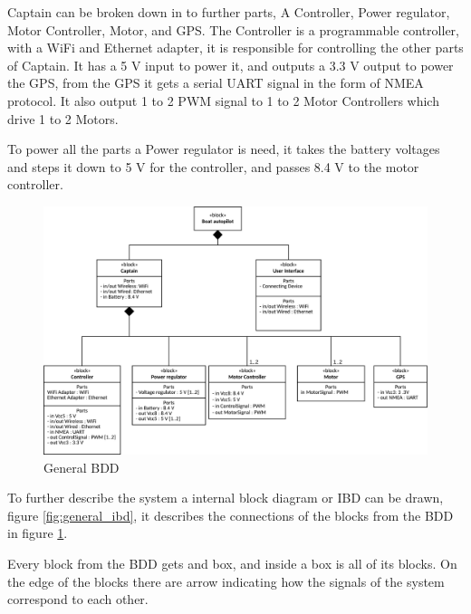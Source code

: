 Captain can be broken down in to further parts, A Controller, Power regulator, Motor Controller, Motor, and GPS.
The Controller is a programmable controller, with a WiFi and Ethernet adapter, it is responsible for controlling the other parts of Captain. It has a 5 V input to power it, and outputs a 3.3 V output to power the GPS, from the GPS it gets a serial UART signal in the form of NMEA protocol. It also output 1 to 2 PWM signal to 1 to 2 Motor Controllers which drive 1 to 2 Motors.

To power all the parts a Power regulator is need, it takes the battery voltages and steps it down to 5 V for the controller, and passes 8.4 V to the motor controller.

\begin{figure}[H]
	\centering
	\includegraphics[width=1\linewidth]{Images/System_architecture/General_BDD}
	\caption{General BDD}
	\label{fig:general_bdd}
\end{figure}

To further describe the system a internal block diagram or IBD can be drawn, figure \ref{fig:general_ibd}, it describes the connections of the blocks from the BDD in figure \ref{fig:general_bdd}. 

Every block from the BDD gets and box, and inside a box is all of its blocks. On the edge of the blocks there are arrow indicating how the signals of the system correspond to each other.

